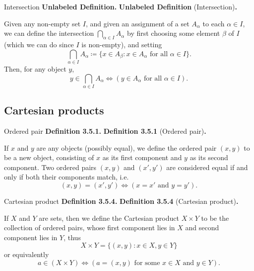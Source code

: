 \documentclass[12pt]{article}
\newenvironment{df}[2][\relax]{
\vspace{4mm}
    \noindent\setlength{\parskip}{1em}%
    \ifx#1\relax%
        \textbf{#2. }%
    \else%
        \textbf{#2} (#1)\textbf{. }%
    \fi%
    \ignorespaces%
}{}
\theoremstyle{remark}
\begin{document}
\begin{df}[Intersection]{Unlabeled Definition}
    Given any non-empty set $I$, and given an assignment of a set $A_\alpha$ to each $\alpha \in I$, we can define the intersection $\bigcap _{\alpha \in I} A_\alpha$ by first choosing some element $\beta$ of $I$ (which we can do since $I$ is non-empty), and setting
    \[
        \bigcap_{\alpha \in I} A_\alpha \coloneqq \{x \in A_\beta : x \in A_\alpha \text{ for all } \alpha \in I \}. \tag{3.3}\label{eq:3.3}
    \]
    Then, for any object $y$,
    {\setlength{\belowdisplayskip}{-10pt} \setlength{\belowdisplayshortskip}{-10pt}
    \[
        y \in \bigcap_{\alpha \in I} A_\alpha \iff (y \in A_\alpha \text{ for all } \alpha \in I). \tag{3.4}\label{eq:3.4}
    \]
    }
\end{df}


\subsection{Cartesian products}
\begin{df}[Ordered pair]{Definition 3.5.1}
    If $x$ and $y$ are any objects (possibly equal), we define the ordered pair $(x, y)$ to be a new object, consisting of $x$ as its first component and $y$ as its second component.
    Two ordered pairs $(x, y)$ and $(x', y')$ are considered equal if and only if both their components match, i.e.
    {\setlength{\belowdisplayskip}{-10pt} \setlength{\belowdisplayshortskip}{-10pt}
    \begin{equation}
        (x, y) = (x', y') \iff (x = x' \text{ and } y = y'). \tag{3.5}\label{eq:3.5}
    \end{equation}
    }
\end{df}


\begin{df}[Cartesian product]{Definition 3.5.4}
    If $X$ and $Y$ are sets, then we define the Cartesian product $X \times Y$ to be the collection of ordered pairs, whose first component lies in $X$ and second component lies in $Y$, thus
    \[
        X \times Y = \{(x, y): x \in X, y \in Y \}
    \]
    or equivalently
    {\setlength{\belowdisplayskip}{-10pt} \setlength{\belowdisplayshortskip}{-10pt}
    \[
        a \in (X \times Y) \iff (a = (x, y) \text{ for some } x \in X \text{ and } y \in Y ).
    \]
    }
\end{df}
\end{document}
